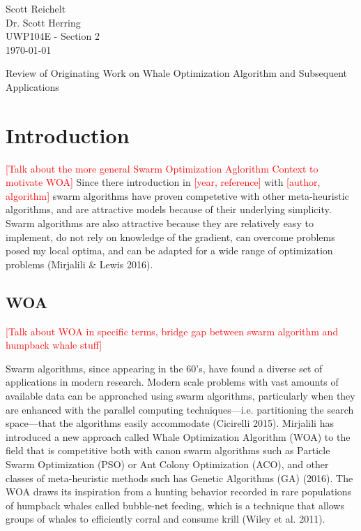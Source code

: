 \documentclass[11pt]{article}
\newcommand{\TODO}[1]{\textcolor{red}{[#1]}}
\begin{document}
    \thispagestyle{empty}
    \begin{flushleft}
        Scott Reichelt\\
        Dr. Scott Herring\\
        UWP104E - Section 2\\
        \today\\
    \end{flushleft}
    \vspace{1em}
    \begin{center}
        Review of Originating Work on Whale Optimization Algorithm and Subsequent Applications
    \end{center}

\section*{Introduction}
\TODO{Talk about the more general Swarm Optimization Aglorithm Context to motivate WOA}
Since there introduction in \TODO{year, reference} with \TODO{author, algorithm} swarm algorithms have proven competetive with other meta-heuristic algorithms, and are attractive models because of their underlying simplicity.
Swarm algorithms are also attractive because they are relatively easy to implement, do not rely on knowledge of the gradient, can overcome problems posed my local optima, and can be adapted for a wide range of optimization problems (Mirjalili \& Lewis 2016).

\subsection*{WOA}
\TODO{Talk about WOA in specific terms, bridge gap between swarm algorithm and humpback whale stuff}

Swarm algorithms, since appearing in the 60's, have found a diverse set of applications in modern research.
Modern scale problems with vast amounts of available data can be approached using swarm algorithms, particularly when they are enhanced with the parallel computing techniques---i.e. partitioning the search space---that the algorithms easily accommodate (Cicirelli 2015).
Mirjalili has introduced a new approach called Whale Optimization Algorithm (WOA) to the field that is competitive both with canon swarm algorithms such as Particle Swarm Optimization (PSO) or Ant Colony Optimization (ACO), and other classes of meta-heuristic methods such has Genetic Algorithms (GA) (2016).
The WOA draws its inspiration from a hunting behavior recorded in rare populations of humpback whales called bubble-net feeding, which is a technique that allows groups of whales to efficiently corral and consume krill (Wiley et al. 2011).
\end{document}
